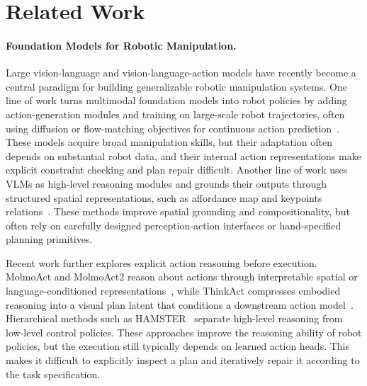 \section{Related Work}
\label{sec:realted_word}
\vspace{-2mm}
\paragraph{Foundation Models for Robotic Manipulation.}
Large vision-language and vision-language-action models have recently become a central paradigm for building generalizable robotic manipulation systems. 
One line of work turns multimodal foundation models into robot policies by adding action-generation modules and training on large-scale robot trajectories, often using diffusion or flow-matching objectives for continuous action prediction~\citep{li2024vision,kim2024openvla,pi0.5}. 
These models acquire broad manipulation skills, but their adaptation often depends on substantial robot data, and their internal action representations make explicit constraint checking and plan repair difficult. 
Another line of work uses VLMs as high-level reasoning modules and grounds their outputs through structured spatial representations, such as affordance map and keypoints relations~\citep{huang2023voxposer,fangandliu2024moka,huang2024rekep,yuan2024robopoint}. 
These methods improve spatial grounding and compositionality, but often rely on carefully designed perception-action interfaces or hand-specified planning primitives.

Recent work further explores explicit action reasoning before execution. MolmoAct and MolmoAct2 reason about actions through interpretable spatial or language-conditioned representations~\citep{lee2025molmoact,fang2026molmoact2actionreasoningmodels}, while ThinkAct compresses embodied reasoning into a visual plan latent that conditions a downstream action model~\citep{huang2026thinkact}. Hierarchical methods such as HAMSTER~\citep{li2025hamster} separate high-level reasoning from low-level control policies. 
These approaches improve the reasoning ability of robot policies, but the execution still typically depends on learned action heads. 
This makes it difficult to explicitly inspect a plan and iteratively repair it according to the task specification.

\vspace{-2mm}
